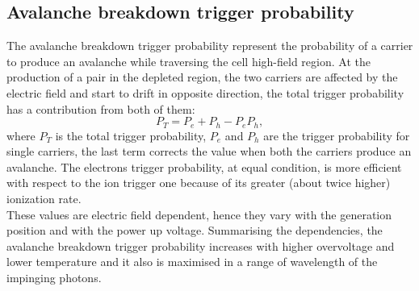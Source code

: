 \subsection*{Avalanche breakdown trigger probability}
The avalanche breakdown trigger probability represent the probability of a carrier to produce an avalanche while traversing the cell high-field region. At the production of a pair in the depleted region, the two carriers are affected by the electric field and start to drift in opposite direction, the total trigger probability has a contribution from both of them:
\begin{equation}
    P_T = P_e + P_h - P_e P_h,
\end{equation}
where $P_T$ is the total trigger probability, $P_e$ and $P_h$ are the trigger probability for single carriers, the last term corrects the value when both the carriers produce an avalanche. 
The electrons trigger probability, at equal condition, is more efficient with respect to the ion trigger one because of its greater (about twice higher) ionization rate.\\
These values are electric field dependent, hence they vary with the generation position and with the power up voltage.
Summarising the dependencies, the avalanche breakdown trigger probability increases with higher overvoltage and lower temperature and it also is maximised in a range of wavelength of the impinging photons.

